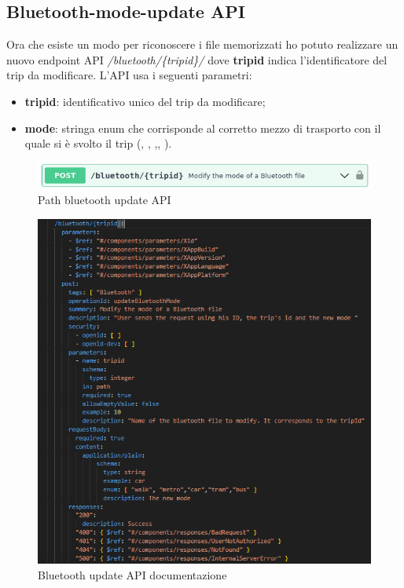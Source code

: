 \documentclass[main.tex]{subfiles}
\begin{document}
\subsection{Bluetooth-mode-update API}
Ora che esiste un modo per riconoscere i file memorizzati ho potuto realizzare un nuovo endpoint API  \emph{/bluetooth/\{tripid\}/} dove \textbf{tripid} indica l'identificatore del trip da modificare.\newline
L'API usa i seguenti parametri:
\begin{itemize}
    \item \textbf{tripid}: identificativo unico del trip da modificare;
    \item \textbf{mode}: stringa enum che corrisponde al corretto mezzo di trasporto con il quale si è svolto il trip (, , ,,  ).
\end{itemize}

\begin{figure}[H]
    \centering
    \includegraphics[width=1\linewidth]{img/primi task/update_bluetooth swagger.png}
    \caption{Path bluetooth update API}
    \label{fig:bluetooth update-path}
\end{figure}

\begin{figure}[H]
    \centering
    \includegraphics[width=1\linewidth]{img/primi task/api-doc.png}
    \caption{Bluetooth update API documentazione}
    \label{fig:bluetooth update-doc}
\end{figure}
\end{document}
